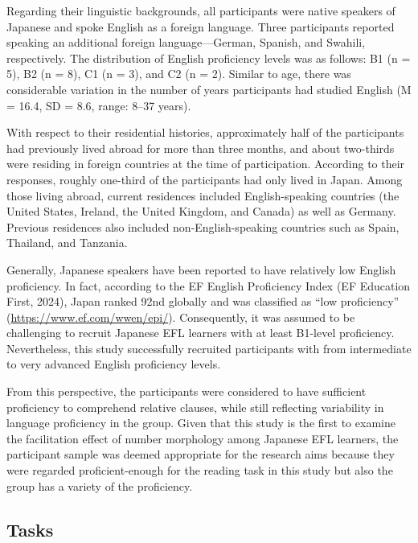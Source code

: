\documentclass[
]{article}
\begin{document}
Regarding their linguistic backgrounds, all participants were native
speakers of Japanese and spoke English as a foreign language. Three
participants reported speaking an additional foreign language---German,
Spanish, and Swahili, respectively. The distribution of English
proficiency levels was as follows: B1 (n = 5), B2 (n = 8), C1 (n = 3),
and C2 (n = 2). Similar to age, there was considerable variation in the
number of years participants had studied English (M = 16.4, SD = 8.6,
range: 8--37 years).

With respect to their residential histories, approximately half of the
participants had previously lived abroad for more than three months, and
about two-thirds were residing in foreign countries at the time of
participation. According to their responses, roughly one-third of the
participants had only lived in Japan. Among those living abroad, current
residences included English-speaking countries (the United States,
Ireland, the United Kingdom, and Canada) as well as Germany. Previous
residences also included non-English-speaking countries such as Spain,
Thailand, and Tanzania.

Generally, Japanese speakers have been reported to have relatively low
English proficiency. In fact, according to the EF English Proficiency
Index (EF Education First, 2024), Japan ranked 92nd globally and was
classified as ``low proficiency'' (\url{https://www.ef.com/wwen/epi/}).
Consequently, it was assumed to be challenging to recruit Japanese EFL
learners with at least B1-level proficiency. Nevertheless, this study
successfully recruited participants with from intermediate to very
advanced English proficiency levels.

From this perspective, the participants were considered to have
sufficient proficiency to comprehend relative clauses, while still
reflecting variability in language proficiency in the group. Given that
this study is the first to examine the facilitation effect of number
morphology among Japanese EFL learners, the participant sample was
deemed appropriate for the research aims because they were regarded
proficient-enough for the reading task in this study but also the group
has a variety of the proficiency.

\subsection{Tasks}\label{tasks}
\end{document}
